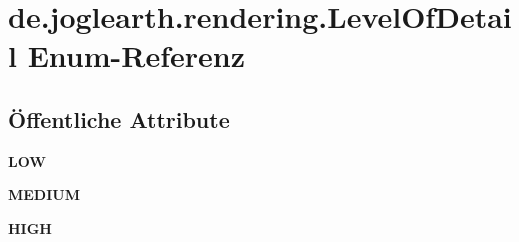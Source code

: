 \section{de.\-joglearth.\-rendering.\-Level\-Of\-Detail Enum-\/\-Referenz}
\label{enumde_1_1joglearth_1_1rendering_1_1_level_of_detail}
\subsection*{Öffentliche Attribute}
\begin{DoxyCompactItemize}
\item 
{\bfseries L\-O\-W}\label{enumde_1_1joglearth_1_1rendering_1_1_level_of_detail_aa31d78c2de0d480bb26f64494f50bc90}

\item 
{\bfseries M\-E\-D\-I\-U\-M}\label{enumde_1_1joglearth_1_1rendering_1_1_level_of_detail_a7f393f63040837c1cbdb72702734af23}

\item 
{\bfseries H\-I\-G\-H}\label{enumde_1_1joglearth_1_1rendering_1_1_level_of_detail_ae2979a91da15545e8392dcfea05cc126}

\end{DoxyCompactItemize}

